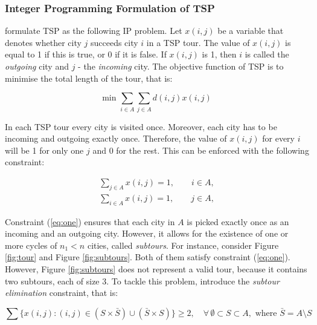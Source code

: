 \documentclass{mprop}
\theoremstyle{definition}
\begin{document}
\subsubsection{Integer Programming Formulation of TSP}
\label{sec:iptspformulation}

\citet{Dantzig54} formulate TSP as the following IP problem. Let $x(i,j)$ be a variable that denotes whether city $j$ succeeds city $i$ in a TSP tour. The value of $x(i,j)$ is equal to 1 if this is true, or 0 if it is false. If $x(i,j)$ is 1, then $i$ is called the \textit{outgoing} city and $j$ - the \textit{incoming} city. The objective function of TSP is to minimise the total length of the tour, that is:

\begin{equation}
\label{eq:objfunc}
\textrm{min } \sum_{i\in A}\sum_{j\in A} d(i,j)x(i,j)
\end{equation}

In each TSP tour every city is visited once. Moreover, each city has to be incoming and outgoing exactly once. Therefore, the value of $x(i,j)$ for every $i$ will be 1 for only one $j$ and 0 for the rest. This can be enforced with the following constraint:

\begin{equation}
\label{eq:one}
\begin{split}
  \sum_{j \in A} x(i,j) = 1, \qquad i \in A,\\
  \sum_{i \in A} x(i,j) = 1, \qquad j \in A,
\end{split}
\end{equation}

Constraint (\ref{eq:one}) ensures that each city in $A$ is picked exactly once as an incoming and an outgoing city. However, it allows for the existence of one or more cycles of $n_{1} < n$ cities, called \textit{subtours}. For instance, consider Figure \ref{fig:tour} and Figure \ref{fig:subtours}. Both of them satisfy constraint (\ref{eq:one}). However, Figure \ref{fig:subtours} does not represent a valid tour, because it contains two subtours, each of size 3. To tackle this problem, \citet{Dantzig54} introduce the \textit{subtour elimination} constraint, that is:

\begin{equation}
\label{eq:subtourElimination}
\sum \{x(i,j) : (i,j) \in (S \times \bar{S}) \cup (\bar{S} \times S)\} \geq 2, \quad \forall \, \emptyset \subset S \subset A, \textrm{ where } \bar{S} = A \setminus S
\end{equation}
\end{document}

